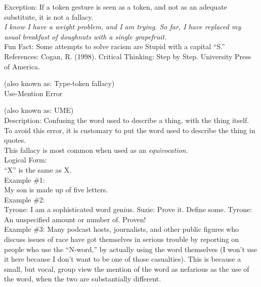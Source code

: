 \documentclass[a4paper,12pt,single,pdftex]{scrartcl}
\begin{document}
      
        Exception: If a token gesture is seen as a token, and not as an adequate substitute, it is not a fallacy.
      \\

      
        {\em I know I have a weight problem, and I am trying.  So far, I have replaced my usual breakfast of doughnuts with a single grapefruit.}
      \\

      
        Fun Fact: Some attempts to solve racism are Stupid with a capital “S.”
      \\

    
    References: Cogan, R. (1998). Critical Thinking: Step by Step. University Press of America.
  
    
      (also known as: Type-token fallacy)
    \\

  

Use-Mention Error
    
      (also known as: UME)
    \\

  
    
      Description:  Confusing the word used to describe a thing, with the thing itself.  To avoid this error, it is customary to put the word used to describe the thing in quotes.
    \\

    
      This fallacy is most common when used as an {\it equivocation}.
    \\

    
      Logical Form:
    \\

    
      “X” is the same as X.
    \\

    
      Example \#1:
    \\

    
      My son is made up of five letters.
    \\

    
      Example \#2:
    \\

    
      Tyrone: I am a sophisticated word genius. \newline
Suzie: Prove it. Define some. \newline
Tyrone: An unspecified amount or number of. Proven!
    \\

    
      Example \#3: Many podcast hosts, journalists, and other public figures who discuss issues of race have got themselves in serious trouble by reporting on people who use the “N-word,” by actually using the word themselves (I won’t use it here because I don’t want to be one of those casualties). This is because a small, but vocal, group view the mention of the word as nefarious as the use of the word, when the two are substantially different.
    \\
\end{document}
